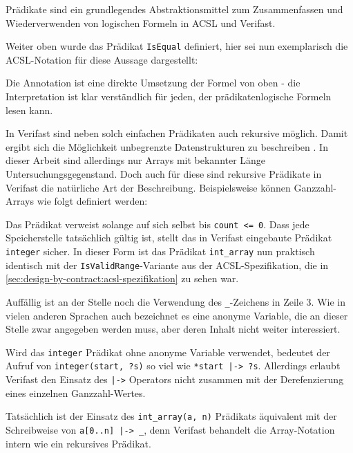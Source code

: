 Prädikate sind ein grundlegendes Abstraktionsmittel zum Zusammenfassen und Wiederverwenden von logischen 
Formeln in ACSL und Verifast.

Weiter oben wurde das Prädikat \lstinline{IsEqual} definiert, hier sei nun exemplarisch die ACSL-Notation
für diese Aussage dargestellt:



Die Annotation ist eine direkte Umsetzung der Formel von oben - die Interpretation ist klar verständlich für 
jeden, der prädikatenlogische Formeln lesen kann.

In Verifast sind neben solch einfachen Prädikaten auch rekursive möglich. Damit ergibt sich die Möglichkeit
unbegrenzte Datenstrukturen zu beschreiben . In dieser
Arbeit sind allerdings nur Arrays mit bekannter Länge Untersuchungsgegenstand. Doch auch für diese sind
rekursive Prädikate in Verifast die natürliche Art der Beschreibung. Beispielsweise können Ganzzahl-Arrays
wie folgt definiert werden:


 
Das Prädikat verweist solange auf sich selbst bis \lstinline{count <= 0}. Dass jede Speicherstelle tatsächlich
gültig ist, stellt das in Verifast eingebaute Prädikat \lstinline{integer} sicher. In dieser Form ist das Prädikat
\lstinline{int_array} nun praktisch identisch mit der \lstinline{IsValidRange}-Variante aus der ACSL-Spezifikation, 
die in \ref{sec:design-by-contract:acsl-spezifikation} zu sehen war.

Auffällig ist an der Stelle noch die Verwendung des \lstinline{_}-Zeichens in Zeile 3. Wie in vielen anderen 
Sprachen auch bezeichnet es eine anonyme Variable, die an dieser Stelle zwar angegeben werden muss, aber deren 
Inhalt nicht weiter interessiert. 

Wird das \lstinline{integer} Prädikat ohne anonyme Variable verwendet, bedeutet der Aufruf von 
\lstinline{integer(start, ?s)} so viel wie \lstinline{*start |-> ?s}. Allerdings erlaubt Verifast
den Einsatz des \lstinline{|->} Operators nicht zusammen mit der Derefenzierung eines einzelnen
Ganzzahl-Wertes.

Tatsächlich ist der Einsatz des \lstinline{int_array(a, n)} Prädikats äquivalent mit der Schreibweise 
von \lstinline{a[0..n] |-> _}, denn Verifast behandelt die Array-Notation intern wie ein rekursives
Prädikat.

